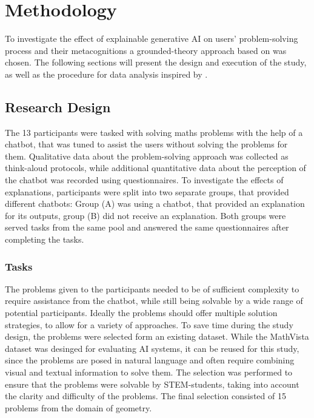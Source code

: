 \section{Methodology} \label{sec:methodology}

To investigate the effect of explainable generative \ac{AI} on users' problem-solving process and their metacognitions a grounded-theory approach based on \cite{Gioia2013} was chosen. The following sections will present the design and execution of the study, as well as the procedure for data analysis inspired by \cite{Jussupow2021}.

\subsection{Research Design} \label{ssec:research_design}

The 13 participants were tasked with solving maths problems with the help of a chatbot, that was tuned to assist the users without solving the problems for them. Qualitative data about the problem-solving approach was collected as think-aloud protocols, while additional quantitative data about the perception of the chatbot was recorded using questionnaires. To investigate the effects of explanations, participants were split into two separate groups, that provided different chatbots: Group (A) was using a chatbot, that provided an explanation for its outputs, group (B) did not receive an explanation. Both groups were served tasks from the same pool and answered the same questionnaires after completing the tasks.

\subsubsection{Tasks} \label{sssec:tasks}

The problems given to the participants needed to be of sufficient complexity to require assistance from the chatbot, while still being solvable by a wide range of potential participants. Ideally the problems should offer multiple solution strategies, to allow for a variety of approaches. To save time during the study design, the problems were selected form an existing dataset. While the MathVista dataset \parencite{MathVista2024} was desinged for evaluating \ac{AI} systems, it can be reused for this study, since the problems are posed in natural language and often require combining visual and textual information to solve them. The selection was performed to ensure that the problems were solvable by \acs{STEM}-students, taking into account the clarity and difficulty of the problems. The final selection consisted of 15 problems from the domain of geometry.

